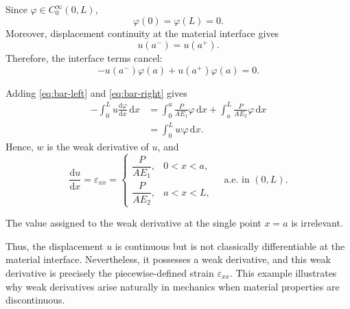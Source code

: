 \documentclass[11pt]{article}
\newcommand{\dd}{\mathrm{d}}
\begin{document}
Since $\varphi\in C_0^\infty(0,L)$,
\[
\varphi(0)=\varphi(L)=0.
\]
Moreover, displacement continuity at the material interface gives
\[
u(a^-)=u(a^+).
\]
Therefore, the interface terms cancel:
\[
-u(a^-)\varphi(a)+u(a^+)\varphi(a)=0.
\]

Adding \eqref{eq:bar-left} and \eqref{eq:bar-right} gives
\begin{align}
-\int_0^L u\frac{\dd\varphi}{\dd x}\,\dd x
&=
\int_0^a \frac{P}{AE_1}\varphi\,\dd x
+
\int_a^L \frac{P}{AE_2}\varphi\,\dd x
\nonumber\\
&=
\int_0^L w\varphi\,\dd x.
\end{align}
Hence, $w$ is the weak derivative of $u$, and
\[
\boxed{
\frac{\dd u}{\dd x}
=
\varepsilon_{xx}
=
\begin{cases}
\dfrac{P}{AE_1}, & 0<x<a,\\[3mm]
\dfrac{P}{AE_2}, & a<x<L,
\end{cases}
\quad\text{a.e. in }(0,L).
}
\]

The value assigned to the weak derivative at the single point $x=a$
is irrelevant.

Thus, the displacement $u$ is continuous but is not classically
differentiable at the material interface. Nevertheless, it possesses
a weak derivative, and this weak derivative is precisely the
piecewise-defined strain $\varepsilon_{xx}$. This example illustrates
why weak derivatives arise naturally in mechanics when material
properties are discontinuous.
\end{document}
